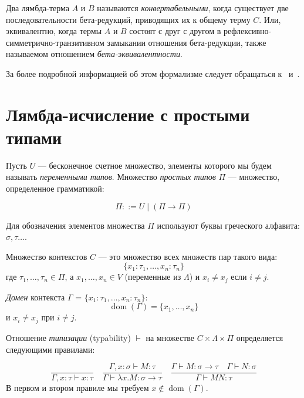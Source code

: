 Два лямбда-терма $A$ и $B$ называются \emph{конвертабельными},
когда существует две последовательности бета-редукций, приводящих их к общему терму $C$.
Или, эквивалентно, когда термы $A$ и $B$ состоят с друг с другом в рефлексивно-симметрично-транзитивном замыкании отношения бета-редукции, также называемом отношением \emph{бета-эквивалентности}.

За более подробной информацией об этом формализме следует обращаться к~\cite{TTFP} и~\cite{Sorensen}.

\section{Лямбда-исчисление с простыми типами}
\begin{definition}
    Пусть $U$ — бесконечное счетное множество, элементы которого мы будем
    называть \emph{переменными типов}.
    Множество \emph{простых типов} $\Pi$ — множество, определенное грамматикой:

    $$ \Pi ::= U \mid (\Pi \to \Pi) $$

    Для обозначения элементов множества $\Pi$ используют буквы греческого алфавита:
    $\sigma, \tau \ldots $.
\end{definition}
\begin{definition}
    Множество контекстов $C$ — это множество всех множеств пар такого вида:
    $$ \{ x_1 : \tau_1 , \ldots , x_n : \tau_n \} $$
    где $ \tau_1 , \ldots , \tau_n \in \Pi$, а
    $ x_1 , \ldots , x_n \in V $ (переменные из $\Lambda$) и $x_i \neq x_j$ если $i \neq j$.
\end{definition}
\begin{definition}
    \emph{Домен} контекста $\Gamma$ = $ \{ x_1 : \tau_1 , \ldots , x_n : \tau_n \} $:
    $$ \operatorname{dom} (\Gamma) = \{ x_1 , \ldots , x_n \} $$ и $x_i \neq x_j$ при $i \neq j$.
\end{definition}
\begin{definition}
    Отношение \emph{типизации} (typability) $ \vdash $ на множестве
    $ C \times \Lambda \times \Pi $ определяется следующими правилами:

    $$ \frac {} {\Gamma, x : \tau \vdash x : \tau}
    \quad
    \frac{\Gamma, x : \sigma \vdash M : \tau}
    {\Gamma \vdash \lambda x . M : \sigma \to \tau}
    \quad
    \frac{\Gamma \vdash M : \sigma \to \tau \quad \Gamma \vdash N : \sigma}
    {\Gamma \vdash M N : \tau}
    $$
    В первом и втором правиле мы требуем $x \notin \operatorname{dom}(\Gamma).$
\end{definition}

